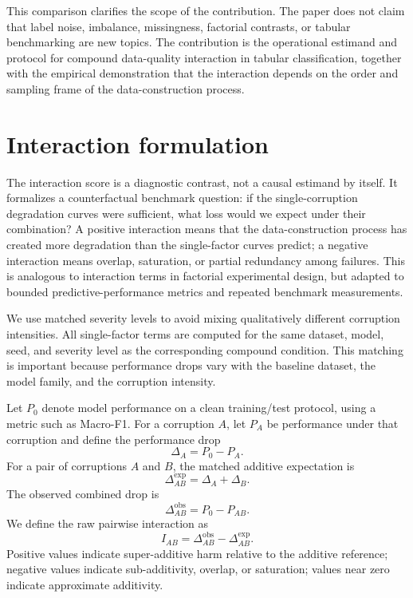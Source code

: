 \documentclass[preprint,12pt,number]{elsarticle}
\begin{document}
This comparison clarifies the scope of the contribution. The paper does not claim that label noise, imbalance, missingness, factorial contrasts, or tabular benchmarking are new topics. The contribution is the operational estimand and protocol for compound data-quality interaction in tabular classification, together with the empirical demonstration that the interaction depends on the order and sampling frame of the data-construction process.
\section{Interaction formulation}

The interaction score is a diagnostic contrast, not a causal estimand by itself. It formalizes a counterfactual benchmark question: if the single-corruption degradation curves were sufficient, what loss would we expect under their combination? A positive interaction means that the data-construction process has created more degradation than the single-factor curves predict; a negative interaction means overlap, saturation, or partial redundancy among failures. This is analogous to interaction terms in factorial experimental design, but adapted to bounded predictive-performance metrics and repeated benchmark measurements.

We use matched severity levels to avoid mixing qualitatively different corruption intensities. All single-factor terms are computed for the same dataset, model, seed, and severity level as the corresponding compound condition. This matching is important because performance drops vary with the baseline dataset, the model family, and the corruption intensity.

Let $P_0$ denote model performance on a clean training/test protocol, using a metric such as Macro-F1. For a corruption $A$, let $P_A$ be performance under that corruption and define the performance drop
\begin{equation}
    \Delta_A = P_0 - P_A.
\end{equation}
For a pair of corruptions $A$ and $B$, the matched additive expectation is
\begin{equation}
    \Delta^{\mathrm{exp}}_{AB} = \Delta_A + \Delta_B.
\end{equation}
The observed combined drop is
\begin{equation}
    \Delta^{\mathrm{obs}}_{AB} = P_0 - P_{AB}.
\end{equation}
We define the raw pairwise interaction as
\begin{equation}
    I_{AB} = \Delta^{\mathrm{obs}}_{AB} - \Delta^{\mathrm{exp}}_{AB}.
\end{equation}
Positive values indicate super-additive harm relative to the additive reference; negative values indicate sub-additivity, overlap, or saturation; values near zero indicate approximate additivity.
\end{document}
